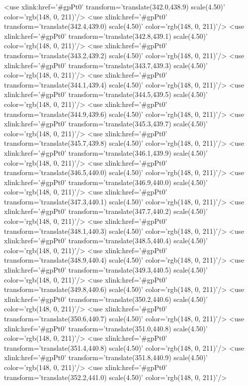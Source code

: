 	<use xlink:href='#gpPt0' transform='translate(342.0,438.9) scale(4.50)' color='rgb(148,   0, 211)'/>
	<use xlink:href='#gpPt0' transform='translate(342.4,439.0) scale(4.50)' color='rgb(148,   0, 211)'/>
	<use xlink:href='#gpPt0' transform='translate(342.8,439.1) scale(4.50)' color='rgb(148,   0, 211)'/>
	<use xlink:href='#gpPt0' transform='translate(343.2,439.2) scale(4.50)' color='rgb(148,   0, 211)'/>
	<use xlink:href='#gpPt0' transform='translate(343.7,439.3) scale(4.50)' color='rgb(148,   0, 211)'/>
	<use xlink:href='#gpPt0' transform='translate(344.1,439.4) scale(4.50)' color='rgb(148,   0, 211)'/>
	<use xlink:href='#gpPt0' transform='translate(344.5,439.5) scale(4.50)' color='rgb(148,   0, 211)'/>
	<use xlink:href='#gpPt0' transform='translate(344.9,439.6) scale(4.50)' color='rgb(148,   0, 211)'/>
	<use xlink:href='#gpPt0' transform='translate(345.3,439.7) scale(4.50)' color='rgb(148,   0, 211)'/>
	<use xlink:href='#gpPt0' transform='translate(345.7,439.8) scale(4.50)' color='rgb(148,   0, 211)'/>
	<use xlink:href='#gpPt0' transform='translate(346.1,439.9) scale(4.50)' color='rgb(148,   0, 211)'/>
	<use xlink:href='#gpPt0' transform='translate(346.5,440.0) scale(4.50)' color='rgb(148,   0, 211)'/>
	<use xlink:href='#gpPt0' transform='translate(346.9,440.0) scale(4.50)' color='rgb(148,   0, 211)'/>
	<use xlink:href='#gpPt0' transform='translate(347.3,440.1) scale(4.50)' color='rgb(148,   0, 211)'/>
	<use xlink:href='#gpPt0' transform='translate(347.7,440.2) scale(4.50)' color='rgb(148,   0, 211)'/>
	<use xlink:href='#gpPt0' transform='translate(348.1,440.3) scale(4.50)' color='rgb(148,   0, 211)'/>
	<use xlink:href='#gpPt0' transform='translate(348.5,440.4) scale(4.50)' color='rgb(148,   0, 211)'/>
	<use xlink:href='#gpPt0' transform='translate(348.9,440.4) scale(4.50)' color='rgb(148,   0, 211)'/>
	<use xlink:href='#gpPt0' transform='translate(349.3,440.5) scale(4.50)' color='rgb(148,   0, 211)'/>
	<use xlink:href='#gpPt0' transform='translate(349.8,440.6) scale(4.50)' color='rgb(148,   0, 211)'/>
	<use xlink:href='#gpPt0' transform='translate(350.2,440.6) scale(4.50)' color='rgb(148,   0, 211)'/>
	<use xlink:href='#gpPt0' transform='translate(350.6,440.7) scale(4.50)' color='rgb(148,   0, 211)'/>
	<use xlink:href='#gpPt0' transform='translate(351.0,440.8) scale(4.50)' color='rgb(148,   0, 211)'/>
	<use xlink:href='#gpPt0' transform='translate(351.4,440.8) scale(4.50)' color='rgb(148,   0, 211)'/>
	<use xlink:href='#gpPt0' transform='translate(351.8,440.9) scale(4.50)' color='rgb(148,   0, 211)'/>
	<use xlink:href='#gpPt0' transform='translate(352.2,441.0) scale(4.50)' color='rgb(148,   0, 211)'/>
